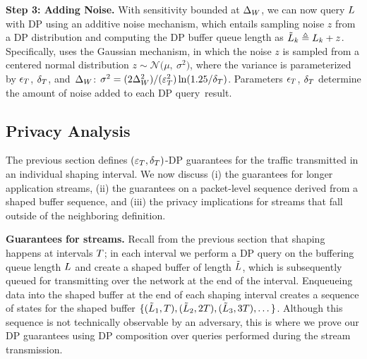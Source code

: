 \textbf{Step 3: Adding Noise.}
With sensitivity bounded at $\Delta_{W}$, we can now query $L$ with DP using
an additive noise mechanism, which entails sampling noise $z$ from a DP
distribution and computing the DP buffer queue length as $\tilde{L}_{k} \triangleq
L_{k} + z$.
Specifically, {\sys} uses the Gaussian mechanism, in which
the noise $z$ is sampled from a centered normal distribution
$z \sim \mathcal{N}\big(\mu,~\sigma^2\big)$, where the variance is parameterized
by $\epsilon_T$, $\delta_T$, and~$\Delta_{W}$:
$\sigma^2 =
(2\Delta_{W}^2)/(\varepsilon_T^2)\ln(1.25/\delta_T)$.
Parameters $\epsilon_T$, $\delta_T$ determine the amount of
noise added to each DP query~result.


\subsection{Privacy Analysis}
\label{subsec:dp-queue-measurements}

The previous section defines $(\varepsilon_{T}, \delta_{T})$-DP
guarantees for the traffic transmitted in an individual shaping interval. We now
discuss (i) the guarantees for longer
application streams, (ii) the guarantees on a packet-level sequence derived from
a shaped buffer sequence, and (iii) the privacy implications for streams that
fall outside of the neighboring definition.

\textbf{Guarantees for streams.}
Recall from the previous section that shaping happens at intervals
$T$; in each interval we perform a DP query on the buffering queue length
$L$ and create a shaped buffer of length $\tilde{L}$, which is subsequently
queued for transmitting over the network at the end of the interval.
%
Enqueueing data into the shaped buffer at the end of each shaping interval
creates a sequence of states for the shaped buffer $\{(\tilde{L}_1, T),
(\tilde{L}_2, 2T), (\tilde{L}_3, 3T), \dots \}$.
Although this sequence is not technically observable by an adversary, this is
where we prove our DP guarantees using DP composition over queries
performed during the stream transmission.

